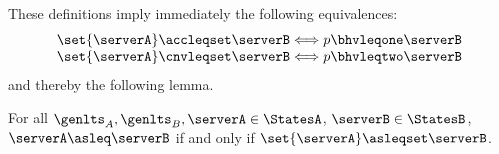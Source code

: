 These definitions imply immediately the following equivalences:
$$
\begin{array}{c}
  \set{\serverA} \accleqset \serverB \Longleftrightarrow p \bhvleqone \serverB\\
  \set{\serverA} \cnvleqset \serverB \Longleftrightarrow p \bhvleqtwo \serverB
  \end{array}
  $$
and thereby the following lemma.
\begin{lemma}
  \label{lem:alt-set-singleton-iff}
  For all $\genlts_A, \genlts_B, \serverA \in \StatesA$,
  $\serverB \in \StatesB$,
  $\serverA \asleq \serverB$ if and only if $\set{\serverA} \asleqset \serverB$.
\end{lemma}




\newcommand{\completewrt}[2]{\ensuremath{\mathsf{cwrt} \, (#1,#2)}}

